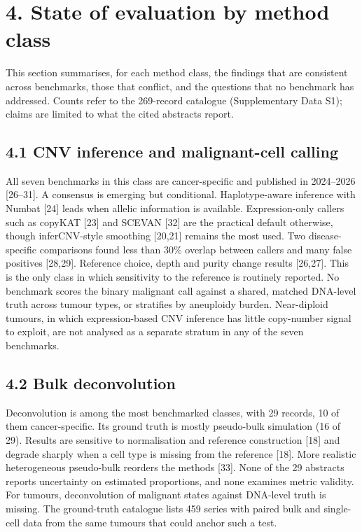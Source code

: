 \documentclass[11pt]{article}
\begin{document}
\section{4. State of evaluation by method class}\label{state-of-evaluation-by-method-class}

This section summarises, for each method class, the findings that are
consistent across benchmarks, those that conflict, and the questions
that no benchmark has addressed. Counts refer to the 269-record
catalogue (Supplementary Data S1); claims are limited to what the cited
abstracts report.

\subsection{4.1 CNV inference and malignant-cell calling}\label{cnv-inference-and-malignant-cell-calling}

All seven benchmarks in this class are cancer-specific and published in
2024--2026 {[}26--31{]}. A consensus is emerging but conditional.
Haplotype-aware inference with Numbat {[}24{]} leads when allelic
information is available. Expression-only callers such as copyKAT
{[}23{]} and SCEVAN {[}32{]} are the practical default otherwise, though
inferCNV-style smoothing {[}20,21{]} remains the most used. Two
disease-specific comparisons found less than 30\% overlap between
callers and many false positives {[}28,29{]}. Reference choice, depth
and purity change results {[}26,27{]}. This is the only class in which
sensitivity to the reference is routinely reported. No benchmark scores
the binary malignant call against a shared, matched DNA-level truth
across tumour types, or stratifies by aneuploidy burden. Near-diploid
tumours, in which expression-based CNV inference has little copy-number
signal to exploit, are not analysed as a separate stratum in any of the
seven benchmarks.

\subsection{4.2 Bulk deconvolution}\label{bulk-deconvolution}

Deconvolution is among the most benchmarked classes, with 29 records, 10
of them cancer-specific. Its ground truth is mostly pseudo-bulk
simulation (16 of 29). Results are sensitive to normalisation and
reference construction {[}18{]} and degrade sharply when a cell type is
missing from the reference {[}18{]}. More realistic heterogeneous
pseudo-bulk reorders the methods {[}33{]}. None of the 29 abstracts
reports uncertainty on estimated proportions, and none examines metric
validity. For tumours, deconvolution of malignant states against
DNA-level truth is missing. The ground-truth catalogue lists 459 series
with paired bulk and single-cell data from the same tumours that could
anchor such a test.
\end{document}
